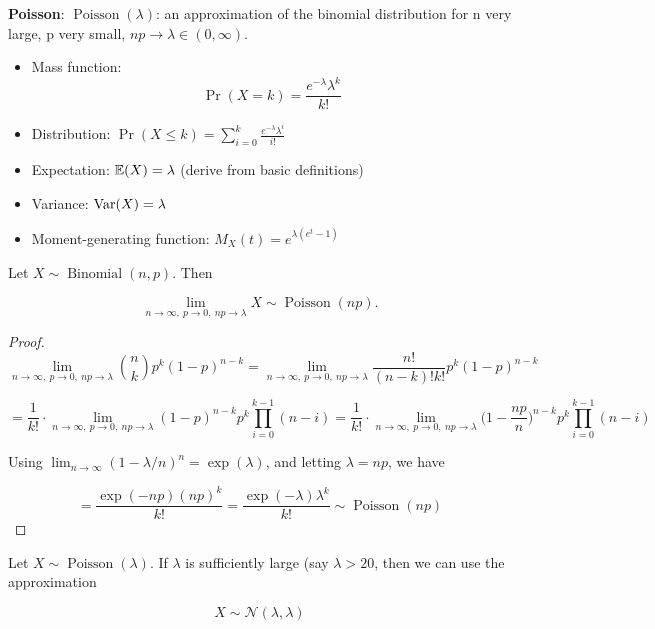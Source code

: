 \textbf{Poisson}:  \(\operatorname{Poisson}(\lambda)\): an approximation of the binomial distribution for n very large, p very small, \(np \to \lambda \in (0, \infty)\).

\begin{itemize}

\item Mass function: \[\Pr(X = k) =  \frac{e^{-\lambda}\lambda^k}{k!} \]

\item Distribution: \(\Pr(X \leq k) = \sum_{i=0}^k  \frac{e^{-\lambda}\lambda^i}{i!}  \)

\item Expectation: \(\mathbb{E}(X) = \lambda \) (derive from basic definitions)

\item Variance: \(\mathrm{Var}(X) = \lambda\)

\item Moment-generating function: \(M_X(t) = e^{\lambda(e^t-1)}\)

\end{itemize}

\begin{proposition}\label{prob.binom.to.poisson}Let \(X \sim \operatorname{Binomial}(n, p)\). Then

\[
\lim_{n \to \infty, \ p \to 0, \ np \to \lambda} X \sim \operatorname{Poisson}(np).
\]

\end{proposition}

\begin{proof}
\[
\lim_{n \to \infty, \ p \to 0, \ np \to \lambda} \binom{n}{k}p^k(1-p)^{n-k} = \lim_{n \to \infty, \ p \to 0, \ np \to \lambda} \frac{n!}{(n-k)!k!} p^k(1-p)^{n-k} 
\]

\[
= \frac{1}{k!} \cdot \lim_{n \to \infty, \ p \to 0, \ np \to \lambda}  (1-p)^{n-k} p^k \prod_{i=0}^{k-1} (n-i)  = \frac{1}{k!} \cdot \lim_{n \to \infty, \ p \to 0, \ np \to \lambda}  \bigg(1-\frac{np}{n} \bigg)^{n-k} p^k \prod_{i=0}^{k-1} (n-i) 
\]

Using \(\lim_{n \to \infty} (1 - \lambda/n)^n = \exp(\lambda) \), and letting \(\lambda =np\), we have

\[
= \frac{\exp(-np)(np)^k}{k!} = \boxed{\frac{\exp(-\lambda)\lambda^k}{k!} } \sim \operatorname{Poisson}(np)
\]
\end{proof}

\begin{proposition}\label{prob.poisson.to.normal}
Let \(X \sim \operatorname{Poisson}(\lambda)\). If \(\lambda\) is sufficiently large (say \(\lambda > 20\), then we can use the approximation

\[
X \sim \mathcal{N}(\lambda, \lambda)
\]

\end{proposition}

